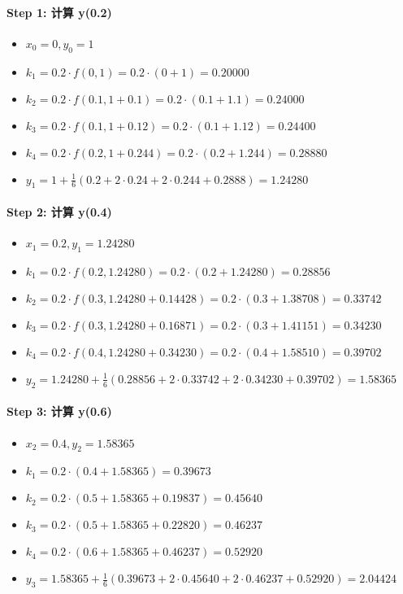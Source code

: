 \documentclass[11pt]{article}
\providecommand{\tightlist}{%
      \setlength{\itemsep}{0pt}\setlength{\parskip}{0pt}}
\begin{document}
\paragraph{Step 1: 计算 y(0.2)}\label{step-1-ux8ba1ux7b97-y0.2}

\begin{itemize}
\tightlist
\item
  \(x_0 = 0, y_0 = 1\)
\item
  \(k_1 = 0.2 \cdot f(0, 1) = 0.2 \cdot (0 + 1) = 0.20000\)
\item
  \(k_2 = 0.2 \cdot f(0.1, 1 + 0.1) = 0.2 \cdot (0.1 + 1.1) = 0.24000\)
\item
  \(k_3 = 0.2 \cdot f(0.1, 1 + 0.12) = 0.2 \cdot (0.1 + 1.12) = 0.24400\)
\item
  \(k_4 = 0.2 \cdot f(0.2, 1 + 0.244) = 0.2 \cdot (0.2 + 1.244) = 0.28880\)
\item
  \(y_1 = 1 + \frac{1}{6}(0.2 + 2 \cdot 0.24 + 2 \cdot 0.244 + 0.2888) = \mathbf{1.24280}\)
\end{itemize}

\paragraph{Step 2: 计算 y(0.4)}\label{step-2-ux8ba1ux7b97-y0.4}

\begin{itemize}
\tightlist
\item
  \(x_1 = 0.2, y_1 = 1.24280\)
\item
  \(k_1 = 0.2 \cdot f(0.2, 1.24280) = 0.2 \cdot (0.2 + 1.24280) = 0.28856\)
\item
  \(k_2 = 0.2 \cdot f(0.3, 1.24280 + 0.14428) = 0.2 \cdot (0.3 + 1.38708) = 0.33742\)
\item
  \(k_3 = 0.2 \cdot f(0.3, 1.24280 + 0.16871) = 0.2 \cdot (0.3 + 1.41151) = 0.34230\)
\item
  \(k_4 = 0.2 \cdot f(0.4, 1.24280 + 0.34230) = 0.2 \cdot (0.4 + 1.58510) = 0.39702\)
\item
  \(y_2 = 1.24280 + \frac{1}{6}(0.28856 + 2 \cdot 0.33742 + 2 \cdot 0.34230 + 0.39702) = \mathbf{1.58365}\)
\end{itemize}

\paragraph{Step 3: 计算 y(0.6)}\label{step-3-ux8ba1ux7b97-y0.6}

\begin{itemize}
\tightlist
\item
  \(x_2 = 0.4, y_2 = 1.58365\)
\item
  \(k_1 = 0.2 \cdot (0.4 + 1.58365) = 0.39673\)
\item
  \(k_2 = 0.2 \cdot (0.5 + 1.58365 + 0.19837) = 0.45640\)
\item
  \(k_3 = 0.2 \cdot (0.5 + 1.58365 + 0.22820) = 0.46237\)
\item
  \(k_4 = 0.2 \cdot (0.6 + 1.58365 + 0.46237) = 0.52920\)
\item
  \(y_3 = 1.58365 + \frac{1}{6}(0.39673 + 2 \cdot 0.45640 + 2 \cdot 0.46237 + 0.52920) = \mathbf{2.04424}\)
\end{itemize}
\end{document}
